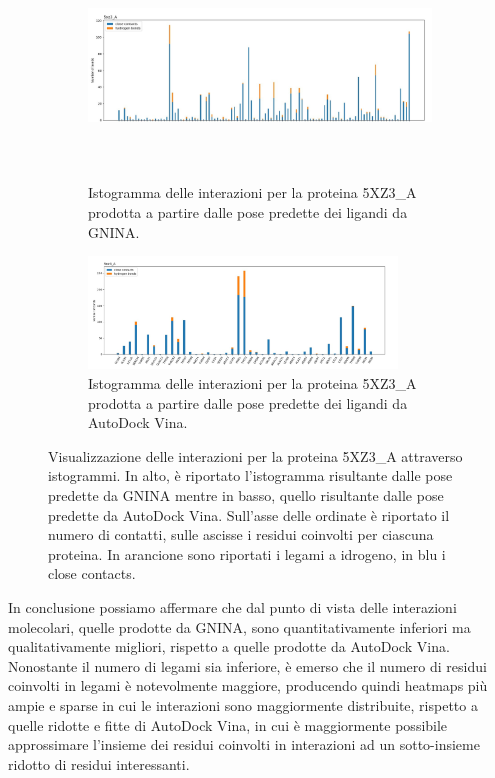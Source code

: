 \begin{figure}
    \centering
    \begin{subfigure}[b]{\textwidth}
        \centering
        \includegraphics[width=\textwidth, height=6cm]{immagini/capitolo4/interactions_gnina_5xz3_a.jpg}
        \caption[]%
        {{\small Istogramma delle interazioni per la proteina 5XZ3\_A prodotta a partire dalle pose predette dei ligandi da GNINA.}}    
        \label{fig:interactions_gnina_5xz3_a}
    \end{subfigure}
    \hfill
    \begin{subfigure}[b]{\textwidth}  
        \centering 
        \includegraphics[width=0.9\textwidth, height=3cm]{immagini/capitolo4/interactions_vina_5xz3_a.jpg}
        \caption[]%
        {{\small Istogramma delle interazioni per la proteina 5XZ3\_A prodotta a partire dalle pose predette dei ligandi da AutoDock Vina.}}    
        \label{fig:interactions_vina_5xz3_a}
    \end{subfigure}
    \caption[Visualizzazione degli istogrammi per la proteina 5XZ3\_A.]
    {\small Visualizzazione delle interazioni per la proteina 5XZ3\_A attraverso istogrammi. In alto, è riportato l'istogramma risultante dalle pose predette da GNINA mentre in basso, quello risultante dalle pose predette da AutoDock Vina. Sull'asse delle ordinate è riportato il numero di contatti, sulle ascisse i residui coinvolti per ciascuna proteina. In arancione sono riportati i legami a idrogeno, in blu i close contacts.} 
    \label{fig:int_5xz3_a}
\end{figure}

In conclusione possiamo affermare che dal punto di vista delle interazioni molecolari, quelle prodotte da GNINA, sono quantitativamente inferiori ma qualitativamente migliori, rispetto a quelle prodotte da AutoDock Vina. Nonostante il numero di legami sia inferiore, è emerso che il numero di residui coinvolti in legami è notevolmente maggiore, producendo quindi heatmaps più ampie e sparse in cui le interazioni sono maggiormente distribuite, rispetto a quelle ridotte e fitte di AutoDock Vina, in cui è maggiormente possibile approssimare l'insieme dei residui coinvolti in interazioni ad un sotto-insieme ridotto di residui interessanti.

